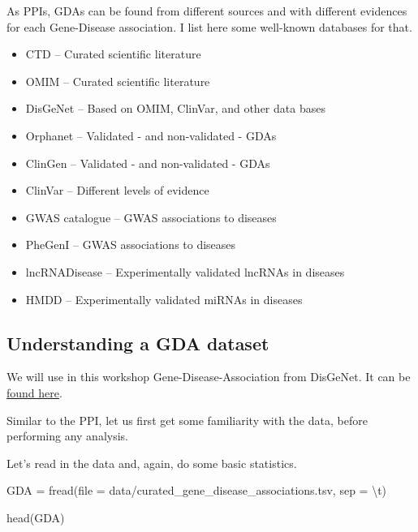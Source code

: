 \documentclass[
]{book}
\newenvironment{Shaded}{\begin{snugshade}}{\end{snugshade}}
\newcommand{\AttributeTok}[1]{\textcolor[rgb]{0.77,0.63,0.00}{#1}}
\newcommand{\FunctionTok}[1]{\textcolor[rgb]{0.00,0.00,0.00}{#1}}
\newcommand{\NormalTok}[1]{#1}
\newcommand{\OtherTok}[1]{\textcolor[rgb]{0.56,0.35,0.01}{#1}}
\newcommand{\SpecialCharTok}[1]{\textcolor[rgb]{0.00,0.00,0.00}{#1}}
\newcommand{\StringTok}[1]{\textcolor[rgb]{0.31,0.60,0.02}{#1}}
\begin{document}
As PPIs, GDAs can be found from different sources and with different evidences for each Gene-Disease association. I list here some well-known databases for that.

\begin{itemize}
\item
  CTD -- Curated scientific literature \citep{davis2020}
\item
  OMIM -- Curated scientific literature \citep{mckusick2007}
\item
  DisGeNet -- Based on OMIM, ClinVar, and other data bases \citep{piñero2019}
\item
  Orphanet -- Validated - and non-validated - GDAs
\item
  ClinGen -- Validated - and non-validated - GDAs \citep{rehm2015}
\item
  ClinVar -- Different levels of evidence \citep{landrum2019}
\item
  GWAS catalogue -- GWAS associations to diseases \citep{buniello2018}
\item
  PheGenI -- GWAS associations to diseases \citep{ramos2013}
\item
  lncRNADisease -- Experimentally validated lncRNAs in diseases \citep{chen2012}
\item
  HMDD -- Experimentally validated miRNAs in diseases \citep{huang2018}
\end{itemize}

\hypertarget{understanding-a-gda-dataset}{%
\subsection{Understanding a GDA dataset}\label{understanding-a-gda-dataset}}

We will use in this workshop Gene-Disease-Association from DisGeNet. It can be \href{https://github.com/deisygysi/NetMed_Workshop/blob/master/data/curated_gene_disease_associations.tsv}{found here}.

Similar to the PPI, let us first get some familiarity with the data, before performing any analysis.

Let's read in the data and, again, do some basic statistics.

\begin{Shaded}
\begin{Highlighting}[]
\NormalTok{GDA }\OtherTok{=} \FunctionTok{fread}\NormalTok{(}\AttributeTok{file =} \StringTok{\textquotesingle{}data/curated\_gene\_disease\_associations.tsv\textquotesingle{}}\NormalTok{, }\AttributeTok{sep =} \StringTok{\textquotesingle{}}\SpecialCharTok{\textbackslash{}t}\StringTok{\textquotesingle{}}\NormalTok{)}

\FunctionTok{head}\NormalTok{(GDA)}
\end{Highlighting}
\end{Shaded}
\end{document}
